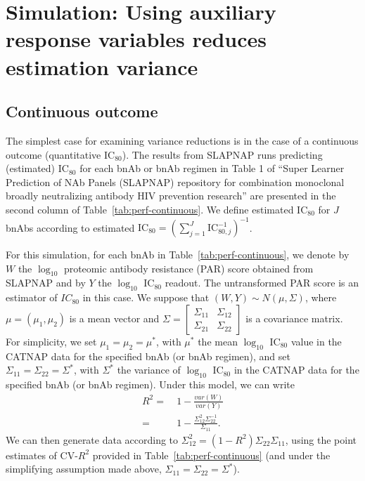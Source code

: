 \documentclass[10pt]{article}
\begin{document}
\section{Simulation: Using auxiliary response variables reduces estimation variance}\label{sec:var_reduce}
\subsection{Continuous outcome}
The simplest case for examining variance reductions is in the case of a continuous outcome (quantitative IC$_{80}$). The results from SLAPNAP runs predicting (estimated) IC$_{80}$ for each bnAb or bnAb regimen in Table 1 of ``Super Learner Prediction of NAb Panels (SLAPNAP) repository for combination monoclonal broadly neutralizing antibody HIV prevention research'' are presented in the second column of Table~\ref{tab:perf-continuous}. We define estimated IC$_{80}$ for $J$ bnAbs according to estimated $\text{IC}_{80} = \left(\sum_{j=1}^J \text{IC}_{80,j}^{-1}\right)^{-1}$.

For this simulation, for each bnAb in Table~\ref{tab:perf-continuous}, we denote by $W$ the $\log_{10}$ proteomic antibody resistance (PAR) score obtained from SLAPNAP and by $Y$ the $\log_{10}$ IC$_{80}$ readout. The untransformed PAR score is an estimator of $IC_{80}$ in this case. We suppose that $(W,Y) \sim N(\mu, \Sigma)$, where $\mu = (\mu_1, \mu_2)$ is a mean vector and $\Sigma = \begin{bmatrix} \Sigma_{11} & \Sigma_{12} \\ \Sigma_{21} & \Sigma_{22} \end{bmatrix}$ is a covariance matrix. For simplicity, we set $\mu_1 = \mu_2 = \mu^*$, with $\mu^*$ the mean $\log_{10}$ IC$_{80}$ value in the CATNAP data \citep{yoon2015} for the specified bnAb (or bnAb regimen), and set $\Sigma_{11} = \Sigma_{22} = \Sigma^*$, with $\Sigma^*$ the variance of $\log_{10}$ IC$_{80}$ in the CATNAP data for the specified bnAb (or bnAb regimen). Under this model, we can write
\begin{align*}
    R^2 =& \ 1 - \frac{var(W)}{var(Y)} \\
    =& \ 1 - \frac{\Sigma_{12}^2\Sigma_{22}^{-1}}{\Sigma_{11}}.
\end{align*}
We can then generate data according to $\Sigma_{12}^2 = (1 - R^2)\Sigma_{22}\Sigma_{11}$, using the point estimates of CV-$R^2$ provided in Table~\ref{tab:perf-continuous} (and under the simplifying assumption made above, $\Sigma_{11} = \Sigma_{22} = \Sigma^*$).
\end{document}
